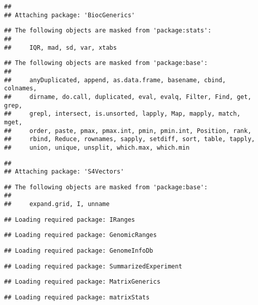 \documentclass[
]{article}
\begin{document}
\begin{verbatim}
## 
## Attaching package: 'BiocGenerics'
\end{verbatim}

\begin{verbatim}
## The following objects are masked from 'package:stats':
## 
##     IQR, mad, sd, var, xtabs
\end{verbatim}

\begin{verbatim}
## The following objects are masked from 'package:base':
## 
##     anyDuplicated, append, as.data.frame, basename, cbind, colnames,
##     dirname, do.call, duplicated, eval, evalq, Filter, Find, get, grep,
##     grepl, intersect, is.unsorted, lapply, Map, mapply, match, mget,
##     order, paste, pmax, pmax.int, pmin, pmin.int, Position, rank,
##     rbind, Reduce, rownames, sapply, setdiff, sort, table, tapply,
##     union, unique, unsplit, which.max, which.min
\end{verbatim}

\begin{verbatim}
## 
## Attaching package: 'S4Vectors'
\end{verbatim}

\begin{verbatim}
## The following objects are masked from 'package:base':
## 
##     expand.grid, I, unname
\end{verbatim}

\begin{verbatim}
## Loading required package: IRanges
\end{verbatim}

\begin{verbatim}
## Loading required package: GenomicRanges
\end{verbatim}

\begin{verbatim}
## Loading required package: GenomeInfoDb
\end{verbatim}

\begin{verbatim}
## Loading required package: SummarizedExperiment
\end{verbatim}

\begin{verbatim}
## Loading required package: MatrixGenerics
\end{verbatim}

\begin{verbatim}
## Loading required package: matrixStats
\end{verbatim}
\end{document}
